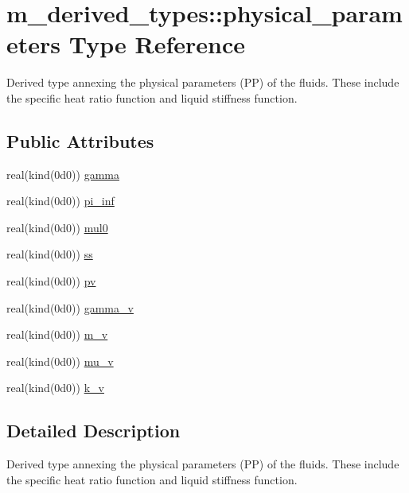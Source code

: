 \hypertarget{structm__derived__types_1_1physical__parameters}{}\section{m\+\_\+derived\+\_\+types\+:\+:physical\+\_\+parameters Type Reference}
\label{structm__derived__types_1_1physical__parameters}


Derived type annexing the physical parameters (PP) of the fluids. These include the specific heat ratio function and liquid stiffness function.  


\subsection*{Public Attributes}
\begin{DoxyCompactItemize}
\item 
real(kind(0d0)) \hyperlink{structm__derived__types_1_1physical__parameters_a767cbe0b3d10bf2fa0ab2e3372881413}{gamma}
\item 
real(kind(0d0)) \hyperlink{structm__derived__types_1_1physical__parameters_a6dbc4e81d0c3ffd4fa80dcfc7a0ea31f}{pi\+\_\+inf}
\item 
real(kind(0d0)) \hyperlink{structm__derived__types_1_1physical__parameters_ac33958817dd32ef7a5536d2d1c81875f}{mul0}
\item 
real(kind(0d0)) \hyperlink{structm__derived__types_1_1physical__parameters_aabd7a1fe772c4e9a6e2f108266ebd94e}{ss}
\item 
real(kind(0d0)) \hyperlink{structm__derived__types_1_1physical__parameters_a7294e13410be9cba57955b3ab7d996a8}{pv}
\item 
real(kind(0d0)) \hyperlink{structm__derived__types_1_1physical__parameters_abd23a0dbe438123007b1d7d19df3c648}{gamma\+\_\+v}
\item 
real(kind(0d0)) \hyperlink{structm__derived__types_1_1physical__parameters_a746535809605882bd17638e8c5b091da}{m\+\_\+v}
\item 
real(kind(0d0)) \hyperlink{structm__derived__types_1_1physical__parameters_ae4f670160d4e4effb657407407fd33e8}{mu\+\_\+v}
\item 
real(kind(0d0)) \hyperlink{structm__derived__types_1_1physical__parameters_a4d91aba9648caf359524976932f83de6}{k\+\_\+v}
\end{DoxyCompactItemize}


\subsection{Detailed Description}
Derived type annexing the physical parameters (PP) of the fluids. These include the specific heat ratio function and liquid stiffness function. 

